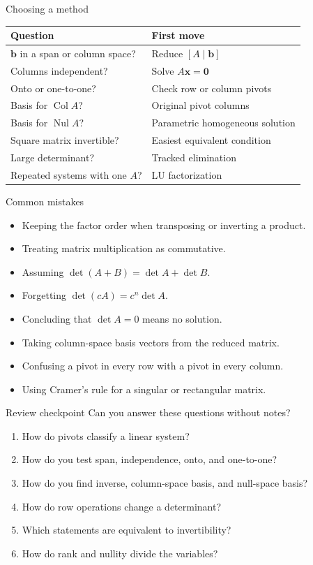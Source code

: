 \documentclass[aspectratio=169]{beamer}
\newcommand{\vect}[1]{\mathbf{#1}}
\newcommand{\Col}{\operatorname{Col}}
\newcommand{\Nul}{\operatorname{Nul}}
\begin{document}
\begin{frame}{Choosing a method}
\small
\renewcommand{\arraystretch}{1.27}
\begin{center}
\begin{tabular}{>{\raggedright\arraybackslash}p{.46\linewidth}>{\raggedright\arraybackslash}p{.42\linewidth}}
\toprule
Question & First move \\
\midrule
$\vect b$ in a span or column space? & Reduce $[A\mid\vect b]$ \\
Columns independent? & Solve $A\vect x=\vect0$ \\
Onto or one-to-one? & Check row or column pivots \\
Basis for $\Col A$? & Original pivot columns \\
Basis for $\Nul A$? & Parametric homogeneous solution \\
Square matrix invertible? & Easiest equivalent condition \\
Large determinant? & Tracked elimination \\
Repeated systems with one $A$? & LU factorization \\
\bottomrule
\end{tabular}
\end{center}
\end{frame}

\begin{frame}{Common mistakes}
\begin{itemize}
  \item Keeping the factor order when transposing or inverting a product.
  \item Treating matrix multiplication as commutative.
  \item Assuming $\det(A+B)=\det A+\det B$.
  \item Forgetting $\det(cA)=c^n\det A$.
  \item Concluding that $\det A=0$ means no solution.
  \item Taking column-space basis vectors from the reduced matrix.
  \item Confusing a pivot in every row with a pivot in every column.
  \item Using Cramer's rule for a singular or rectangular matrix.
\end{itemize}
\end{frame}

\begin{frame}{Review checkpoint}
Can you answer these questions without notes?
\begin{enumerate}
  \item How do pivots classify a linear system?
  \item How do you test span, independence, onto, and one-to-one?
  \item How do you find inverse, column-space basis, and null-space basis?
  \item How do row operations change a determinant?
  \item Which statements are equivalent to invertibility?
  \item How do rank and nullity divide the variables?
\end{enumerate}
\end{frame}
\end{document}
